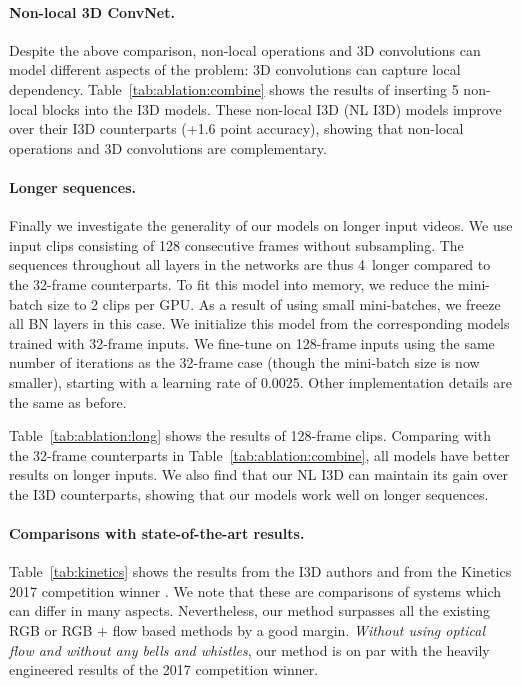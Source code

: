 \documentclass[10pt,twocolumn,letterpaper]{article}
\def\x{}
\begin{document}
\paragraph{Non-local 3D ConvNet.} Despite the above comparison, non-local operations and 3D convolutions can model different aspects of the problem: 3D convolutions can capture local dependency.  Table~\ref{tab:ablation:combine} shows the results of inserting 5 non-local blocks into the I3D models. These non-local I3D (NL I3D) models improve over their I3D counterparts (+1.6 point accuracy), showing that non-local operations and 3D convolutions are complementary.

\paragraph{Longer sequences.} Finally we investigate the generality of our models on longer input videos. We use input clips consisting of 128 consecutive frames without subsampling.
The sequences throughout all layers in the networks are thus 4\x~longer compared to the 32-frame counterparts. To fit this model into memory, we reduce the mini-batch size to 2 clips per GPU. As a result of using small mini-batches, we freeze all BN layers in this case. We initialize this model from the corresponding models trained with 32-frame inputs. We fine-tune on 128-frame inputs using the same number of iterations as the 32-frame case (though the mini-batch size is now smaller), starting with a learning rate of 0.0025. Other implementation details are the same as before.

Table~\ref{tab:ablation:long} shows the results of 128-frame clips. Comparing with the 32-frame counterparts in Table~\ref{tab:ablation:combine}, all models have better results on longer inputs. We also find that our NL I3D can maintain its gain over the I3D counterparts, showing that our models work well on longer sequences.


\paragraph{Comparisons with state-of-the-art results.} Table~\ref{tab:kinetics} shows the results from the I3D authors \cite{Carreira2017} and from the Kinetics 2017 competition winner \cite{Bian2017}. We note that these are comparisons of systems which can differ in many aspects. Nevertheless, our method surpasses all the existing RGB or RGB + flow based methods by a good margin. \emph{Without using optical flow and without any bells and whistles}, our method is on par with the heavily engineered results of the 2017 competition winner.
\end{document}
